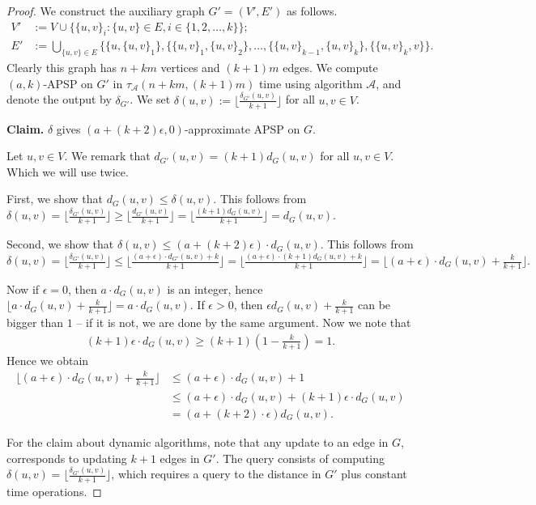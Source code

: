 \thmreduction*
\begin{proof}
    We construct the auxiliary graph $G'=(V',E')$ as follows.
    \begin{align*}
        V' &:= V \cup \{ \{u,v\}_i : \{u,v\}\in E, i\in\{1, 2, \dots, k\}\}; \\
        E' &:= \bigcup_{\{u,v\}\in E} \{ \{u, \{u,v\}_1\}, \{\{u,v\}_1,\{u,v\}_2\}, \dots, \{\{u,v\}_{k-1},\{u,v\}_k\}, \{\{u,v\}_k, v\} \}.
    \end{align*}
    Clearly this graph has $n+km$ vertices and $(k+1)m$ edges. We compute $(a,k)$-APSP on $G'$ in $\tau_{\mathcal A}(n+km,(k+1)m)$ time using algorithm $\mathcal{A}$, and denote the output by $\delta_{G'}$.
    We set $\delta(u,v) := \lfloor \tfrac{\delta_{G'}(u,v)}{k+1}\rfloor$ for all $u,v\in V$. 

    \textbf{Claim.} $\delta$ gives $(a+(k+2)\epsilon,0)$-approximate APSP on $G$. 

    Let $u,v\in V$. We remark that $d_{G'}(u,v)=(k+1)d_G(u,v)$ for all $u,v\in V$. Which we will use twice. %
    
    First, we show that $d_G(u,v)\leq \delta(u,v)$.  This follows from $\delta(u,v) = \lfloor \tfrac{\delta_{G'}(u,v)}{k+1}\rfloor \geq \lfloor \tfrac{d_{G'}(u,v)}{k+1}\rfloor = \lfloor \tfrac{(k+1)d_G(u,v)}{k+1}\rfloor=d_G(u,v)$. 

    Second, we show that $\delta(u,v) \leq (a+(k+2)\epsilon)\cdot d_G(u,v)$. This follows from
    $$\delta(u,v) = \lfloor \tfrac{\delta_{G'}(u,v)}{k+1}\rfloor \leq \lfloor \tfrac{(a+\epsilon)\cdot d_{G'}(u,v)+k}{k+1}\rfloor = \lfloor \tfrac{(a+\epsilon)\cdot (k+1)d_{G}(u,v)+k}{k+1}\rfloor= \lfloor (a+\epsilon)\cdot d_G(u,v) +\tfrac{k}{k+1}\rfloor.$$

    Now if $\epsilon=0$, then $a\cdot d_G(u,v)$ is an integer, hence $\lfloor a\cdot d_G(u,v) +\tfrac{k}{k+1}\rfloor = a\cdot d_G(u,v) $. If $\epsilon>0$, then $\epsilon d_G(u,v)+ \tfrac{k}{k+1}$ can be bigger than $1$ -- if it is not, we are done by the same argument. Now we note that 
    \begin{align*}
        (k+1)\epsilon\cdot d_G(u,v) \geq (k+1)\left(1-\tfrac{k}{k+1}\right) =1.
    \end{align*}
    Hence we obtain 
    \begin{align*}
        \lfloor (a+\epsilon)\cdot d_G(u,v) +\tfrac{k}{k+1}\rfloor &\leq (a+\epsilon)\cdot d_G(u,v) +1 \\
        &\leq (a+\epsilon)\cdot d_G(u,v) + (k+1)\epsilon\cdot d_G(u,v)\\
        &= (a+(k+2)\cdot \epsilon)d_G(u,v).
    \end{align*}
    

    For the claim about dynamic algorithms, note that any update to an edge in $G$, corresponds to updating $k+1$ edges in $G'$. The query consists of computing $\delta(u,v) = \lfloor \tfrac{\delta_{G'}(u,v)}{k+1}\rfloor$, which requires a query to the distance in $G'$ plus constant time operations. 
\end{proof}

